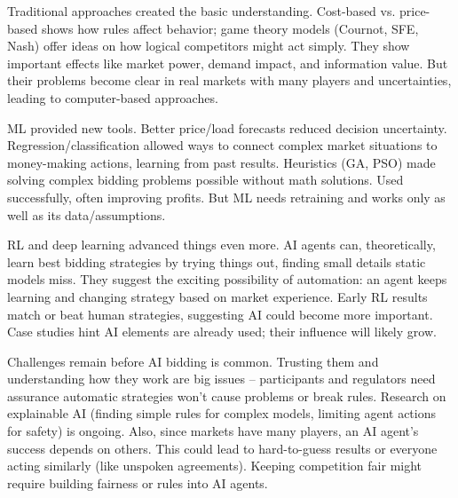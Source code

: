 \documentclass[conference]{IEEEtran}
\begin{document}
Traditional approaches created the basic understanding. Cost-based vs. price-based shows how rules affect behavior; game theory models (Cournot, SFE, Nash) offer ideas on how logical competitors might act simply. They show important effects like market power, demand impact, and information value. But their problems become clear in real markets with many players and uncertainties, leading to computer-based approaches.

ML provided new tools. Better price/load forecasts reduced decision uncertainty. Regression/classification allowed ways to connect complex market situations to money-making actions, learning from past results. Heuristics (GA, PSO) made solving complex bidding problems possible without math solutions. Used successfully, often improving profits. But ML needs retraining and works only as well as its data/assumptions.

RL and deep learning advanced things even more. AI agents can, theoretically, learn best bidding strategies by trying things out, finding small details static models miss. They suggest the exciting possibility of automation: an agent keeps learning and changing strategy based on market experience. Early RL results match or beat human strategies, suggesting AI could become more important. Case studies hint AI elements are already used; their influence will likely grow.

Challenges remain before AI bidding is common. Trusting them and understanding how they work are big issues – participants and regulators need assurance automatic strategies won't cause problems or break rules. Research on explainable AI (finding simple rules for complex models, limiting agent actions for safety) is ongoing. Also, since markets have many players, an AI agent's success depends on others. This could lead to hard-to-guess results or everyone acting similarly (like unspoken agreements). Keeping competition fair might require building fairness or rules into AI agents.
\end{document}
